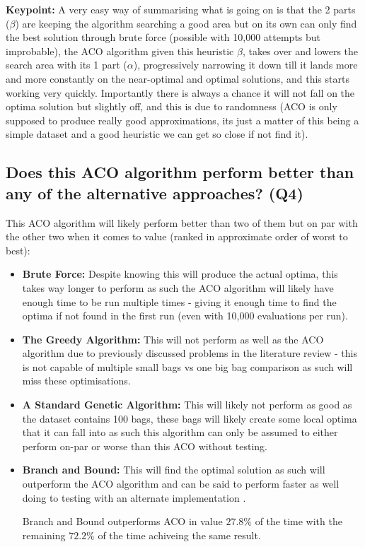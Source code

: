\documentclass[11pt]{article}
\begin{document}
\textbf{Keypoint:} A very easy way of summarising what is going on is that the 2 parts ($\beta$) are keeping the algorithm searching a good area but on its own can only find the best solution through brute force (possible with 10,000 attempts but improbable), the ACO algorithm given this heuristic $\beta$, takes over and lowers the search area with its 1 part ($\alpha$), progressively narrowing it down till it lands more and more constantly on the near-optimal and optimal solutions, and this starts working very quickly. Importantly there is always a chance it will not fall on the optima solution but slightly off, and this is due to randomness (ACO is only supposed to produce really good approximations, its just a matter of this being a simple dataset and a good heuristic we can get so close if not find it). 

\subsection{Does this ACO algorithm perform better than any of the alternative approaches? (Q4)}

This ACO algorithm will likely perform better than two of them but on par with the other two when it comes to value (ranked in approximate order of worst to best): 
\begin{itemize}
    \item \textbf{Brute Force:} Despite knowing this will produce the actual optima, this takes way longer to perform as such the ACO algorithm will likely have enough time to be run multiple times - giving it enough time to find the optima if not found in the first run (even with 10,000 evaluations per run).
    \item \textbf{The Greedy Algorithm:} This will not perform as well as the ACO algorithm due to previously discussed problems in the literature review - this is not capable of multiple small bags vs one big bag comparison as such will miss these optimisations. 
    \item \textbf{A Standard Genetic Algorithm:} This will likely not perform as good as the dataset contains 100 bags, these bags will likely create some local optima that it can fall into as such this algorithm can only be assumed to either perform on-par or worse than this ACO without testing. 
    \item \textbf{Branch and Bound:} This will find the optimal solution as such will outperform the ACO algorithm and can be said to perform faster as well doing to testing with an alternate implementation \cite{branch_and_bond_2024}. 

    Branch and Bound outperforms ACO in value $27.8\%$ of the time with the remaining $72.2\%$ of the time achiveing the same result. 
\end{itemize}
\end{document}
